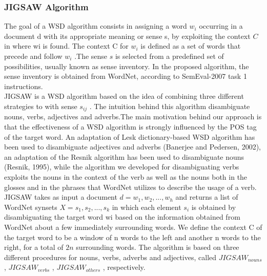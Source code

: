 \subsubsection{JIGSAW Algorithm\citep{disambiguation}}
\label{jigsawSec}
The goal of a WSD algorithm consists in assigning a word $w_i$ occurring in a document d with its appropriate meaning or sense s, by exploiting the context $C$ in where wi is found. The context C for $w_i$ is defined as a set of words that precede and follow $w_i$ .The sense $s$ is selected from a predefined set of possibilities, usually known as sense inventory. In the proposed algorithm, the sense inventory is obtained from WordNet, according to SemEval-2007 task 1 instructions. \\
JIGSAW is a WSD algorithm based on the idea of combining three different strategies to with sense $s_{ij}$ . The intuition behind this algorithm disambiguate nouns, verbs, adjectives and adverbs.The main motivation behind our approach is that the effectiveness of a WSD algorithm is strongly influenced by the POS tag of the target word. An adaptation of Lesk dictionary-based WSD algorithm has been used to disambiguate adjectives and adverbs (Banerjee and Pedersen, 2002), an adaptation of the Resnik algorithm has been used to disambiguate nouns (Resnik, 1995), while the algorithm we developed for disambiguating verbs exploits the nouns in the context of the verb as well as the nouns both in the glosses and in the phrases that WordNet utilizes to describe the usage of a verb. \\
JIGSAW takes as input a document $d = {w_1 , w_2 , . . . , w_h }$ and returns a list of WordNet synsets $X = {s_1 , s_2 , . . . ,s_k }$ in which each element $s_i$ is obtained by disambiguating the target word wi based on the information obtained from WordNet about a few immediately surrounding words. We define the context C of the target word to be a window of n words to the left and another n words to the right, for a total of $2n$ surrounding words. The algorithm is based on three different procedures for nouns, verbs, adverbs and adjectives, called $JIGSAW_{nouns}$ , $JIGSAW_{verbs}$ , $JIGSAW_{others}$ , respectively.


